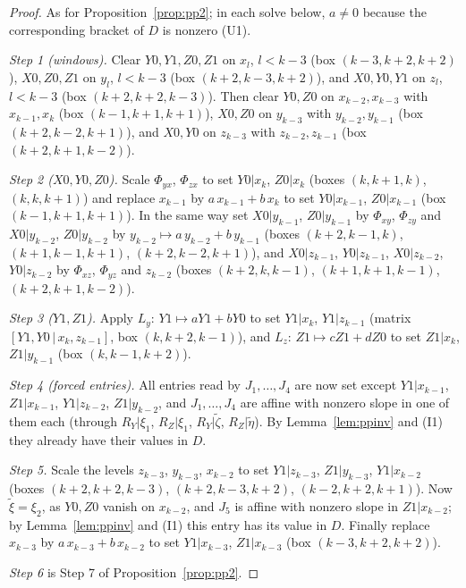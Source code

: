 \documentclass[11pt]{amsart}
\theoremstyle{definition}
\theoremstyle{plain}
\begin{document}
\begin{proof}
As for Proposition~\ref{prop:pp2}; in each solve below, $a\ne0$ because the corresponding bracket of $D$ is nonzero (U1).

\emph{Step 1 (windows).} Clear $Y0,Y1,Z0,Z1$ on $x_l$, $l<k-3$ (box $(k-3,k+2,k+2)$), $X0,Z0,Z1$ on $y_l$, $l<k-3$ (box $(k+2,k-3,k+2)$), and $X0,Y0,Y1$ on $z_l$, $l<k-3$ (box $(k+2,k+2,k-3)$). Then clear $Y0,Z0$ on $x_{k-2},x_{k-3}$ with $x_{k-1},x_k$ (box $(k-1,k+1,k+1)$), $X0,Z0$ on $y_{k-3}$ with $y_{k-2},y_{k-1}$ (box $(k+2,k-2,k+1)$), and $X0,Y0$ on $z_{k-3}$ with $z_{k-2},z_{k-1}$ (box $(k+2,k+1,k-2)$).

\emph{Step 2 ($X0,Y0,Z0$).} Scale $\Phi_{yx}$, $\Phi_{zx}$ to set $Y0|x_k$, $Z0|x_k$ (boxes $(k,k+1,k)$, $(k,k,k+1)$) and replace $x_{k-1}$ by $a\,x_{k-1}+b\,x_k$ to set $Y0|x_{k-1}$, $Z0|x_{k-1}$ (box $(k-1,k+1,k+1)$). In the same way set $X0|y_{k-1}$, $Z0|y_{k-1}$ by $\Phi_{xy}$, $\Phi_{zy}$ and $X0|y_{k-2}$, $Z0|y_{k-2}$ by $y_{k-2}\mapsto a\,y_{k-2}+b\,y_{k-1}$ (boxes $(k+2,k-1,k)$, $(k+1,k-1,k+1)$, $(k+2,k-2,k+1)$), and $X0|z_{k-1}$, $Y0|z_{k-1}$, $X0|z_{k-2}$, $Y0|z_{k-2}$ by $\Phi_{xz}$, $\Phi_{yz}$ and $z_{k-2}$ (boxes $(k+2,k,k-1)$, $(k+1,k+1,k-1)$, $(k+2,k+1,k-2)$).

\emph{Step 3 ($Y1,Z1$).} Apply $L_y$: $Y1\mapsto aY1+bY0$ to set $Y1|x_k$, $Y1|z_{k-1}$ (matrix $[Y1,Y0\,|\allowbreak\,x_k,z_{k-1}]$, box $(k,k+2,k-1)$), and $L_z$: $Z1\mapsto cZ1+dZ0$ to set $Z1|x_k$, $Z1|y_{k-1}$ (box $(k,k-1,k+2)$).

\emph{Step 4 (forced entries).} All entries read by $J_1,\dots,J_4$ are now set except $Y1|x_{k-1}$, $Z1|x_{k-1}$, $Y1|z_{k-2}$, $Z1|y_{k-2}$, and $J_1,\dots,J_4$ are affine with nonzero slope in one of them each (through $R_Y|\xi_1$, $R_Z|\xi_1$, $R_Y|\tilde\zeta$, $R_Z|\tilde\eta$). By Lemma~\ref{lem:ppinv} and (I1) they already have their values in $D$.

\emph{Step 5.} Scale the levels $z_{k-3}$, $y_{k-3}$, $x_{k-2}$ to set $Y1|z_{k-3}$, $Z1|y_{k-3}$, $Y1|x_{k-2}$ (boxes $(k+2,k+2,k-3)$, $(k+2,k-3,k+2)$, $(k-2,k+2,k+1)$). Now $\tilde\xi=\xi_2$, as $Y0,Z0$ vanish on $x_{k-2}$, and $J_5$ is affine with nonzero slope in $Z1|x_{k-2}$; by Lemma~\ref{lem:ppinv} and (I1) this entry has its value in $D$. Finally replace $x_{k-3}$ by $a\,x_{k-3}+b\,x_{k-2}$ to set $Y1|x_{k-3}$, $Z1|x_{k-3}$ (box $(k-3,k+2,k+2)$).

\emph{Step 6} is Step 7 of Proposition~\ref{prop:pp2}.
\end{proof}
\end{document}
